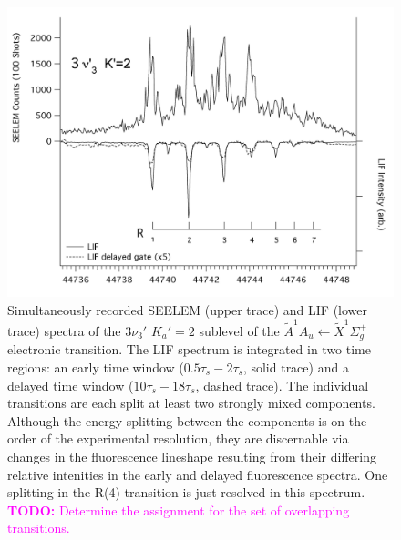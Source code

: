 \documentclass[12pt]{mitthesis}
\newcommand{\TODO} [1]{\textcolor{magenta}{\textbf{TODO:} #1}}
\begin{document}
\begin{figure}
  \caption{Simultaneously recorded SEELEM (upper trace) and LIF (lower
    trace) spectra of the $3\nu_3'$ $K_a'\!=\!2$ sublevel of the
    $\tilde{A}^1A_u \leftarrow \tilde{X} ^1\Sigma_g^+$ electronic
    transition.  The LIF spectrum is integrated in two time regions:
    an early time window ($0.5\tau_s-2\tau_s$, solid trace) and a
    delayed time window ($10\tau_s-18\tau_s$, dashed trace).  The
    individual transitions are each split at least two strongly mixed
    components.  Although the energy splitting between the components
    is on the order of the experimental resolution, they are
    discernable via changes in the fluorescence lineshape resulting
    from their differing relative intenities in the early and delayed
    fluorescence spectra.  One splitting in the R(4) transition is
    just resolved in this spectrum.  \TODO{Determine the assignment for
    the set of overlapping transitions.}}
  \label{fig:spectrum-33k2}
  \centering
  \includegraphics[width=7in,angle=90]{acetylene-33k2-r1r7.png}
\end{figure}
\end{document}
